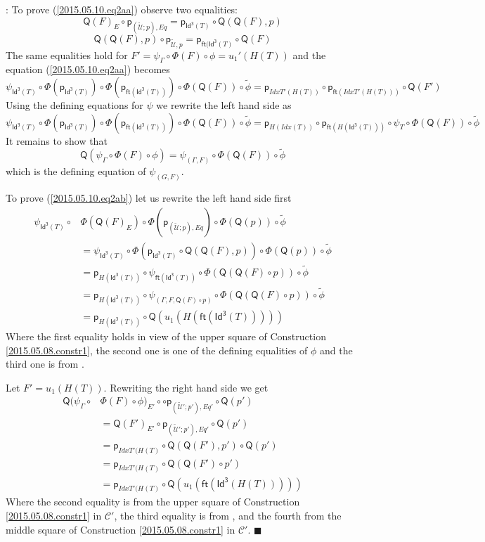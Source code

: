 \documentclass[12pt]{article}
\numberwithin{equation}{section}
\newenvironment{myproof}{{\bf Proof}:}{$\blacksquare$ \vskip 5mm }
\newcommand{\wt}{\widetilde}
\newcommand{\ft}{\mathsf{ft}}
\newcommand{\p}{\mathsf{p}}
\newcommand{\Idx}{\mathsf{Id^3}} %
\newcommand{\U}{\mathcal{U}}
\newcommand{\Q}{\mathsf{Q}}
\begin{document}
\begin{myproof}
To prove (\ref{2015.05.10.eq2aa}) observe two equalities:
%
$$\Q(F)_E\circ \p_{(\wt{\U};p),Eq}=\p_{\Idx(T)}\circ \Q(\Q(F),p)$$
%
$$\Q(\Q(F),p)\circ \p_{\wt{\U},p}=\p_{\ft(\Idx(T)}\circ \Q(F)$$
%
The same equalities hold for $F'=\psi_{\Gamma}\circ\Phi(F)\circ
\phi=u_1'(H(T))$ and the equation (\ref{2015.05.10.eq2aa}) becomes
%
$$\psi_{\Idx(T)}\circ \Phi(\p_{\Idx(T)})\circ \Phi(\p_{\ft(\Idx(T))})\circ
\Phi(\Q(F))\circ \wt{\phi}=\p_{IdxT'(H(T))}\circ \p_{\ft(IdxT'(H(T)))}\circ \Q(F')$$
%
Using the defining equations for $\psi$ we rewrite the left hand side as
%
$$\psi_{\Idx(T)}\circ \Phi(\p_{\Idx(T)})\circ \Phi(\p_{\ft(\Idx(T))})\circ
\Phi(\Q(F))\circ \wt{\phi}=\p_{H(Idx(T))}\circ \p_{\ft(H(\Idx(T)))}\circ
\psi_{T}\circ \Phi(\Q(F))\circ \wt{\phi}$$
%
It remains to show that
%
$$\Q(\psi_{\Gamma}\circ \Phi(F)\circ \phi)=\psi_{(\Gamma,F)}\circ
\Phi(\Q(F))\circ \wt{\phi}$$
%
which is the defining equation of $\psi_{(G,F)}$.

To prove (\ref{2015.05.10.eq2ab}) let us rewrite the left hand side first
%
\begin{align*}
  \psi_{\Idx(T)}\circ & \Phi(\Q(F)_E)\circ \Phi(\p_{(\wt{\U};p),Eq})\circ \Phi(\Q(p))\circ \wt{\phi} \\
    & = \psi_{\Idx(T)}\circ \Phi(\p_{\Idx(T)}\circ \Q(\Q(F),p))\circ \Phi(\Q(p))\circ\wt{\phi} \\
    & = \p_{H(\Idx(T))}\circ \psi_{\ft(\Idx(T))}\circ \Phi(\Q(\Q(F)\circ p))\circ \wt{\phi} \\
    & = \p_{H(\Idx(T))}\circ \psi_{(\Gamma,F,\Q(F)\circ p)}\circ \Phi(\Q(\Q(F)\circ p))\circ \wt{\phi} \\
    & = \p_{H(\Idx(T))}\circ   \Q(u_1(H(\ft(\Idx(T)))))
\end{align*}
%
Where the first equality holds in view of the upper square of Construction
\ref{2015.05.08.constr1}, the second one is one of the defining equalities of
$\phi$ and the third one is from \cite[Lemma 3.2]{fromunivwithPi}.

Let $F'=u_1(H(T))$. Rewriting the right hand side we get
%
\begin{align*}
  \Q(\psi_{\Gamma}\circ & \Phi(F)\circ \phi)_{E'}\circ \circ \p_{(\wt{\U}';p'),Eq'}\circ \Q(p') \\
    & = \Q(F')_{E'}\circ \p_{(\wt{\U}';p'),Eq'}\circ \Q(p') \\
    & = \p_{IdxT'(H(T)}\circ \Q(\Q(F'),p')\circ \Q(p') \\
    & = \p_{IdxT'(H(T)}\circ \Q(\Q(F')\circ p') \\
    & = \p_{IdxT'(H(T)}\circ \Q(u_1(\ft(\Idx(H(T)))))
\end{align*}
%
Where the second equality is from the upper square of Construction
\ref{2015.05.08.constr1} in $\mathcal C'$, the third equality is from
\cite[Lemma 3.2]{fromunivwithPi}, and the fourth from the middle square of
Construction \ref{2015.05.08.constr1} in $\mathcal C'$.
\end{myproof}
\end{document}
